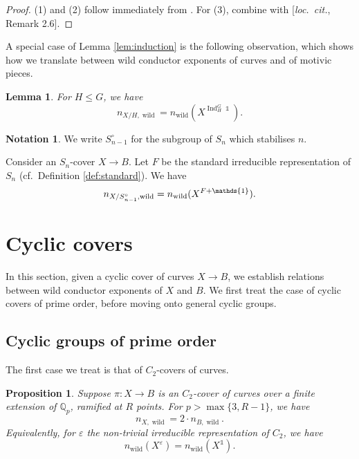 \documentclass[12pt]{amsart}
\newtheorem{lemma}[theorem]{Lemma}
\newtheorem{proposition}[theorem]{Proposition}
\theoremstyle{definition}
\newtheorem*{notation}{Notation}
\newenvironment{example}
  {\pushQED{\qed}\renewcommand{\qedsymbol}{$\diamondsuit$}\examplex}
  {\popQED\endexamplex}
\theoremstyle{remark}
\newcommand{\eps}{\varepsilon}
\newcommand{\QQ}{\mathbb{Q}}
\DeclareMathOperator{\Ind}{Ind}
\DeclareMathOperator{\wild}{wild}
\DeclareMathOperator{\one}{\mathds{1}}
\begin{document}
\begin{proof}
    (1) and (2) follow immediately from \cite[Proposition 2.8]{DGKM}. For (3), combine with [\textit{loc.\ cit.}, Remark 2.6].
\end{proof}

A special case of Lemma \ref{lem:induction} is the following observation, which shows how we translate between wild conductor exponents of curves and of motivic pieces.

\begin{lemma}\label{lem:curvinduct}
    For $H\le G$, we have
    \[n_{X/H,\wild}=n_{\wild}(X^{\Ind_H^G \one}).\]
\end{lemma}

\begin{notation}
    We write $S_{n-1}^\circ$ for the subgroup of $S_n$ which stabilises $n$.
\end{notation}

\begin{example}
    Consider an $S_n$-cover $X\to B$. Let $F$ be the standard irreducible representation of $S_n$ (cf.\ Definition \ref{def:standard}). We have 
    \[n_{X/S_{n-1}^\circ,\wild}=n_{\wild}(X^{F+\one}).\qedhere\]
\end{example}

\section{Cyclic covers}\label{sec:cyclic}

In this section, given a cyclic cover of curves $X\to B$, we establish relations between wild conductor exponents of $X$ and $B$. We first treat the case of cyclic covers of prime order, before moving onto general cyclic groups.

\subsection{Cyclic groups of prime order}\label{sec:cyclic_prime}

The first case we treat is that of $C_2$-covers of curves.

\begin{proposition}\label{prop:unramC2}
    Suppose $\pi:X\to B$ is an $C_2$-cover of curves over a finite extension of $\QQ_p$, ramified at $R$ points. For $p>\max\{3,R-1\}$, we have
    \[n_{X,\wild}=2\cdot n_{B,\wild}.\]
    Equivalently, for $\eps$ the non-trivial irreducible representation of $C_2$, we have
    \[ n_{\wild}(X^\eps)=n_{\wild}(X^{\one}). \]
\end{proposition}
\end{document}
